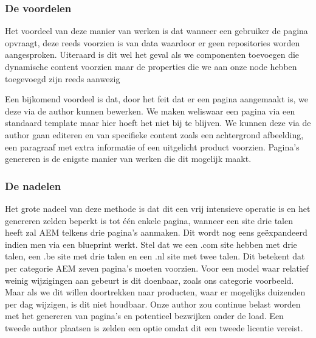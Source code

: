 \documentclass{article}
\begin{document}
	\subsubsection{De voordelen}
    Het voordeel van deze manier van werken is dat wanneer een gebruiker de pagina opvraagt, deze reeds voorzien is van data waardoor er geen repositories worden aangesproken. Uiteraard is dit wel het geval als we componenten toevoegen die dynamische content voorzien maar de properties die we aan onze node hebben toegevoegd zijn reeds aanwezig
    \par
     Een bijkomend voordeel is dat, door het feit dat er een pagina aangemaakt is, we deze via de author kunnen bewerken. We maken weliswaar een pagina via een standaard template maar hier hoeft het niet bij te blijven. We kunnen deze via de author gaan editeren en van specifieke content zoals een achtergrond afbeelding, een paragraaf met extra informatie of een uitgelicht product voorzien. Pagina's genereren is de enigste manier van werken die dit mogelijk maakt.
	\subsubsection{De nadelen}
    Het grote nadeel van deze methode is dat dit een vrij intensieve operatie is en het genereren zelden beperkt is tot \'e\'en enkele pagina, wanneer een site drie talen heeft zal AEM telkens drie pagina's aanmaken. Dit wordt nog eens geëxpandeerd indien men via een blueprint werkt. Stel dat we een .com site hebben met drie talen, een .be site met drie talen en een .nl site met twee talen. Dit betekent dat per categorie AEM zeven pagina's moeten voorzien. Voor een model waar relatief weinig wijzigingen aan gebeurt is dit doenbaar, zoals ons categorie voorbeeld. Maar als we dit willen doortrekken naar producten, waar er mogelijks duizenden per dag wijzigen, is dit niet houdbaar. Onze author zou continue belast worden met het genereren van pagina's en potentieel bezwijken onder de load. Een tweede author plaatsen is zelden een optie omdat dit een tweede licentie vereist.
\end{document}
